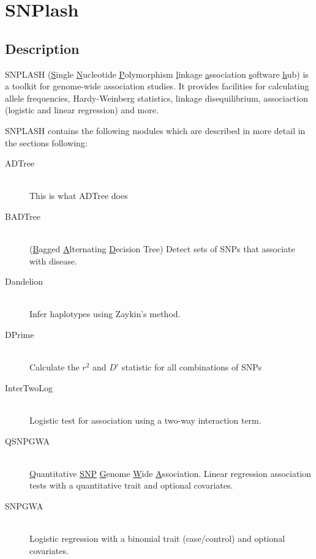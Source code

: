 \section{SNPlash}
\label{sec:snplash}

\subsection{Description}
SNPLASH (\underline{S}ingle \underline{N}ucleotide \underline{P}olymorphism
\underline{l}inkage \underline{a}ssociation \underline{s}oftware
\underline{h}ub) is a toolkit for genome-wide association studies.  It provides
facilities for calculating allele frequencies, Hardy-Weinberg statistics,
linkage disequilibrium, associaction (logistic and linear regression) and more.

SNPLASH contains the following modules which are described in more detail in the
sections following:

\begin{description}

  \item[ADTree]  \hfill \\
    This is what ADTree does

  \item[BADTree] \hfill \\
    (\underline{B}agged \underline{A}lternating \underline{D}ecision Tree)
    Detect sets of SNPs that associate with disease.

  \item[Dandelion] \hfill \\
    Infer haplotypes using Zaykin's method\cite{Zaykin02}.

  \item[DPrime] \hfill \\
    Calculate the $r^2$ and $D'$ statistic for all combinations of SNPs

  \item[InterTwoLog] \hfill \\
    Logistic test for association using a two-way interaction term.
  \item[QSNPGWA] \hfill \\
    \underline{Q}uantitative \underline{SNP} \underline{G}enome \underline{W}ide
    \underline{A}ssociation.  Linear regression association tests with a
    quantitative trait and optional covariates.
  \item[SNPGWA] \hfill \\
    Logistic regression with a binomial trait (case/control) and optional
    covariates. 
\end{description}

